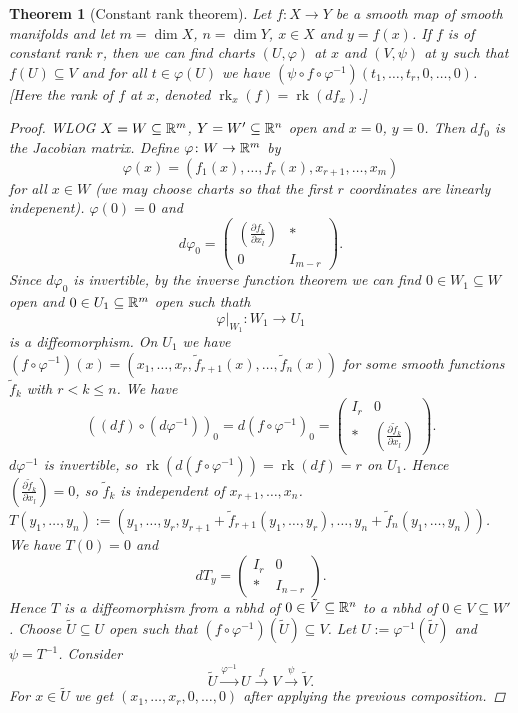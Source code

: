 \documentclass[A4paper, british, reqno]{amsart}
\theoremstyle{darkgreentheorem}
\newtheorem{thm}{Theorem}[section]
\theoremstyle{darkbluedefinition}
\theoremstyle{darkredexample}
\theoremstyle{remark}
\DeclareMathOperator{\rk}{rk}
\newcommand{\1}{\mathbbm{1}}
\newcommand{\sub}{\subseteq}
\begin{document}
\begin{thm}[Constant rank theorem]
    Let $f\colon X\to Y$ be a smooth map of smooth manifolds and let $m=\dim{X}$, $n=\dim{Y}$, $x\in X$ and $y=f(x)$.
    If $f$ is of constant rank $r$, then we can find charts $(U,\varphi)$ at $x$ and $(V,\psi)$ at $y$ such that $f(U)\sub V$ and for all $t\in \varphi(U)$ we have $(\psi \circ f\circ \varphi^{-1})(t_{1},\ldots,t_{r},0,\ldots,0)$.
    [Here the rank of $f$ at $x$, denoted $\rk_{x}(f)=\rk(df_{x})$.]
    \begin{proof}
	WLOG $X=W\sub \R^{m}$, $Y=W'\sub \R^{n}$ open and $x=0$, $y=0$.
	Then $df_{0}$ is the Jacobian matrix.
	Define $\varphi \colon W\to \mathbb{R}^{m}$ by
	\[ \varphi(x)=(f_{1}(x),\ldots,f_{r}(x),x_{r+1},\ldots,x_{m}) \]
	for all $x\in W$ (we may choose charts so that the first $r$ coordinates are linearly indepenent).
	$\varphi(0)=0$ and
	\[ d\varphi_{0}=\begin{pmatrix} \left(\frac{\partial f_{k}}{\partial x_{l}}\right) & * \\ 0 & I_{m-r} \end{pmatrix}. \]
	    Since $d\varphi_{0}$ is invertible, by the inverse function theorem we can find $0\in W_{1}\sub W$ open and $0\in U_{1}\sub \R^{m}$ open such thath
	\[ \varphi|_{W_{1}}\colon W_{1}\to U_{1} \]
	is a diffeomorphism.
	On $U_{1}$ we have $(f\circ \varphi^{-1})(x)=(x_{1},\ldots,x_{r},\tilde{f}_{r+1}(x),\ldots,\tilde{f}_{n}(x))$ for some smooth functions $\tilde{f}_{k}$ with $r<k\leqslant n$.
	We have
	\[ ((df)\circ (d\varphi^{-1}))_{0}=d(f\circ \varphi^{-1})_{0}=\begin{pmatrix} I_{r} & 0 \\ * & \left( \frac{\partial \tilde{f}_{k}}{\partial x_{l}}\right) \end{pmatrix}.\]
	$d\varphi^{-1}$ is invertible, so $\rk(d(f\circ \varphi^{-1}))=\rk(df)=r$ on $U_{1}$.
	Hence $\left(\frac{\partial \tilde{f}_{k}}{\partial x_{l}}\right) = 0 $, so $\tilde{f}_{k}$ is independent of $x_{r+1},\ldots, x_{n}$.
	$T(y_{1},\ldots,y_{n}):=(y_{1},\ldots,y_{r}, y_{r+1}+\tilde{f}_{r+1}(y_{1},\ldots,y_{r}),\ldots,y_{n}+\tilde{f}_{n}(y_{1},\ldots,y_{n}))$.
	We have $T(0)=0$ and
	\[ dT_{y}=\begin{pmatrix} I_{r} & 0 \\ * & I_{n-r}\end{pmatrix}. \]
	Hence $T$ is a diffeomorphism from a nbhd of $0\in \tilde{V}\sub \R^{n}$ to a nbhd of $0\in V\sub W'$.
	Choose $\tilde{U}\sub U$ open such that $(f\circ \varphi^{-1})(\tilde{U})\sub V$.
	Let $U:=\varphi^{-1}(\tilde{U})$ and $\psi=T^{-1}$.
	Consider
	\[ \tilde{U}\xrightarrow{\varphi^{-1}}U\xrightarrow{f}V\xrightarrow{\psi}\tilde{V}. \]
	For $x\in \tilde{U}$ we get $(x_{1},\ldots,x_{r},0,\ldots,0)$ after applying the previous composition.
    \end{proof}
\end{thm}
\end{document}
